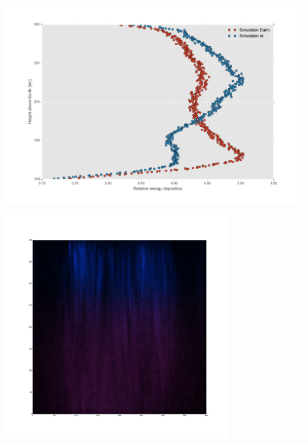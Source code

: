 \documentclass[xcolor=pdftex,dvipsnames,table,usenames,11pt]{beamer}
\begin{document}
\begin{frame}
\begin{center}
\includegraphics[width=1.0\textwidth]{img/energy_deposition_Earth_vs_io.pdf}
\end{center}
\end{frame}



\begin{frame}
\begin{center}
\href{run:/home/kmills/Dropbox/3.AdvancedTopics/AdvancedTopics/project/AuroraSim/presentation/vid/Io_1.mkv}{
	\includegraphics[width=0.75\textwidth]{img/io_first.png}
	}
\end{center}
\end{frame}



\begin{frame}

\end{frame}
\end{document}
